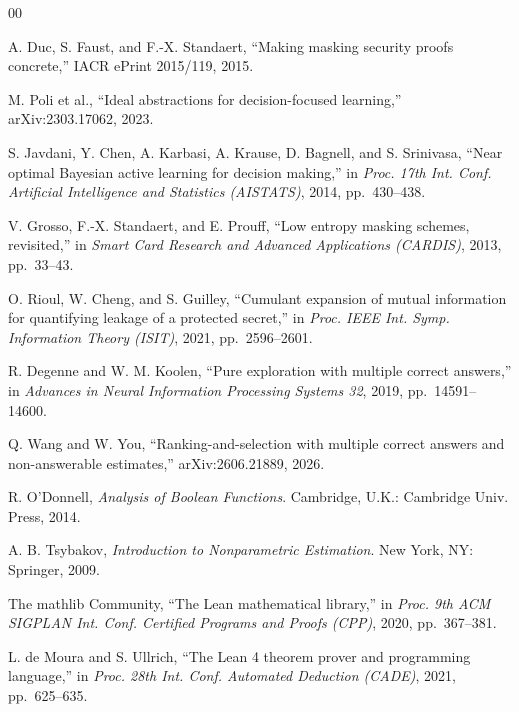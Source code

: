 \begin{thebibliography}{00}

 A. Duc, S. Faust, and F.-X. Standaert, ``Making masking security
proofs concrete,'' IACR ePrint 2015/119, 2015.

 M. Poli et al., ``Ideal abstractions for decision-focused learning,''
arXiv:2303.17062, 2023.


 S. Javdani, Y. Chen, A. Karbasi, A. Krause, D. Bagnell, and
S. Srinivasa, ``Near optimal Bayesian active learning for decision making,'' in
\emph{Proc. 17th Int. Conf. Artificial Intelligence and Statistics (AISTATS)}, 2014,
pp.~430--438.

 V. Grosso, F.-X. Standaert, and E. Prouff, ``Low entropy masking
schemes, revisited,'' in \emph{Smart Card Research and Advanced Applications (CARDIS)},
2013, pp.~33--43.

 O. Rioul, W. Cheng, and S. Guilley, ``Cumulant expansion of mutual
information for quantifying leakage of a protected secret,'' in \emph{Proc. IEEE Int. Symp.
Information Theory (ISIT)}, 2021, pp.~2596--2601.

 R. Degenne and W. M. Koolen, ``Pure exploration with multiple correct
answers,'' in \emph{Advances in Neural Information Processing Systems 32}, 2019,
pp.~14591--14600.

 Q. Wang and W. You, ``Ranking-and-selection with multiple correct answers and non-answerable estimates,'' arXiv:2606.21889, 2026.

 R. O'Donnell, \emph{Analysis of Boolean Functions}. Cambridge,
U.K.: Cambridge Univ. Press, 2014.

 A. B. Tsybakov, \emph{Introduction to Nonparametric Estimation}.
New York, NY: Springer, 2009.

 The mathlib Community, ``The Lean mathematical library,'' in
\emph{Proc. 9th ACM SIGPLAN Int. Conf. Certified Programs and Proofs (CPP)}, 2020,
pp.~367--381.

 L. de Moura and S. Ullrich, ``The Lean 4 theorem prover and
programming language,'' in \emph{Proc. 28th Int. Conf. Automated Deduction (CADE)}, 2021,
pp.~625--635.

\end{thebibliography}


